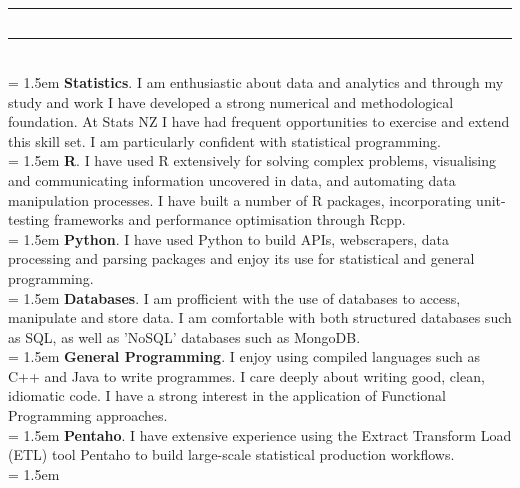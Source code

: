 \documentclass{article}[10pt] %
\newcommand{\heading}[1]{
	\vspace{22pt}
	\sectionline
	\subsection*{\color{titlecolour}\centering{#1}}	\sectionline \\
}
\renewenvironment{itemize*}{

  \begin{list}{}{
    \itemsep 4pt
    \setlength{\leftmargin}{1.5em}
  }
}{
  \end{list}
    \vspace{7pt}
}
\newcommand{\sectionline}{%
  \vspace{-6pt}%
 {\centering\rule{\linewidth}{.7pt}}
  \vspace{-13pt}
}
\begin{document}
\begin{multicols}{2}

\heading{Technical Skills}
\vspace{8pt}
\hangindent = 1.5em
\vspace{2pt}
{\bfseries \color{altcolour}Statistics}. I am enthusiastic about data and analytics and through my study and work I have developed a strong numerical and methodological foundation. At Stats NZ I have had frequent opportunities to exercise and extend this skill set. I am particularly confident with statistical programming.\\
\hangindent = 1.5em
\vspace{6pt}
{\bfseries \color{altcolour}R}. I have used R extensively for solving complex problems, visualising and communicating information uncovered in data, and automating data manipulation processes. I have built a number of R packages, incorporating unit-testing frameworks and performance optimisation through Rcpp.\\
\hangindent = 1.5em
\vspace{6pt}
{\bfseries \color{altcolour}Python}. I have used Python to build APIs, webscrapers, data processing and parsing packages and enjoy its use for statistical and general programming.\\
\hangindent = 1.5em
\vspace{6pt}
{\bfseries \color{altcolour}Databases}. I am profficient with the use of databases to access, manipulate and store data. I am comfortable with both structured databases such as SQL, as well as 'NoSQL' databases such as MongoDB.\\
\hangindent = 1.5em
\vspace{6pt}
{\bfseries \color{altcolour}General Programming}. I enjoy using compiled languages such as C++ and Java to write programmes. I care deeply about writing good, clean, idiomatic code. I have a strong interest in the application of Functional Programming approaches.\\
\hangindent = 1.5em
\vspace{6pt}
{\bfseries \color{altcolour}Pentaho}. I have extensive experience using the Extract Transform Load (ETL) tool Pentaho to build large-scale statistical production workflows.\\
\hangindent = 1.5em
\vspace{6pt}

\vspace{-8pt}


\end{multicols}
\end{document}
